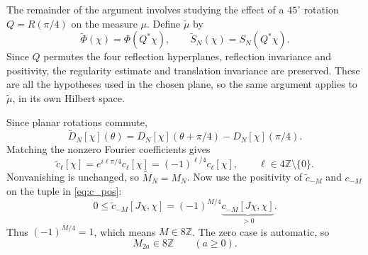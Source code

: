 \documentclass[11pt, letterpaper, reqno]{amsart}
\theoremstyle{definition}
\theoremstyle{remark}
\newcommand{\bbZ}{\mathbb{Z}}
\begin{document}
The remainder of the argument involves studying the effect of a
$45^\circ$ rotation $Q=R(\pi/4)$ on the measure $\mu$. Define
$\tilde\mu$ by
\begin{equation}
 \tilde\Phi(\chi)=\Phi(Q^*\chi),\qquad
 \tilde S_N(\chi)=S_N(Q^*\chi).
\end{equation}
Since $Q$ permutes the four reflection hyperplanes,
reflection invariance and positivity, the regularity estimate and
translation invariance are preserved. These are all the hypotheses
used in the chosen plane, so the same argument applies to
$\tilde\mu$, in its own Hilbert space.

Since planar rotations commute,
\begin{equation}
 \tilde D_N[\chi](\theta)
       =D_N[\chi](\theta+\pi/4)-D_N[\chi](\pi/4).
\end{equation}
Matching the nonzero Fourier coefficients gives
\begin{equation}\label{eq:tilt-coefficient}
 \tilde c_\ell[\chi]=e^{i\ell\pi/4}c_\ell[\chi]
                  =(-1)^{\ell/4}c_\ell[\chi],
 \qquad\ell\in4\bbZ\setminus\{0\}.
\end{equation}
Nonvanishing is unchanged, so $\tilde M_N=M_N$.
Now use the positivity of $\tilde c_{-M}$ and $c_{-M}$ on the tuple
in \eqref{eq:c_pos}:
\begin{equation}
 0\leq\tilde c_{-M}[J\chi,\chi]
     =(-1)^{M/4}\underbrace{c_{-M}[J\chi,\chi]}_{>0}.
\end{equation}
Thus $(-1)^{M/4}=1$, which means $M\in8\bbZ$.
The zero case is automatic, so
\begin{equation}\label{eq:8}
 M_{2a}\in8\bbZ\qquad(a\geq0).
\end{equation}
\end{document}
